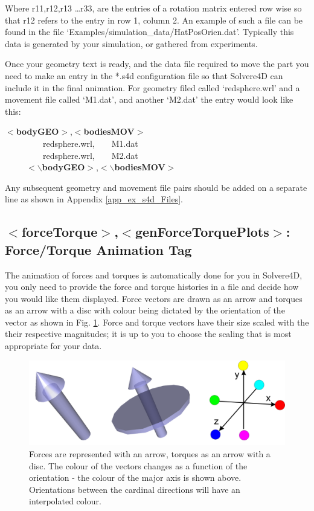 \documentclass[singlecolumn,12pt]{article}
\newcommand{\hlstd}[1]{\textcolor[rgb]{0,0,0}{#1}}
\newcommand{\hlkey}[1]{\textcolor[rgb]{0,0,1}{\bf{#1}}}
\begin{document}
Where r11,r12,r13 \ldots r33, are the entries of a rotation matrix
entered row wise so that r12 refers to the entry in row 1, column 2.
An example of such a file can be found in the file
`Examples/simulation\_data/HatPosOrien.dat'. Typically this data is
generated by your simulation, or gathered from experiments.

Once your geometry text is ready, and the data file required to move
the part you need to make an entry in the *.s4d configuration file
so that Solvere4D can include it in the final animation. For
geometry filed called `redsphere.wrl' and a movement file called
`M1.dat', and another `M2.dat' the entry would look like this:

\vspace{1cm}
\hlkey{$<$bodyGEO$>$}\hlstd{,}\hlkey{$<$bodiesMOV$>$}\hlstd{\\
\hlstd{\ \ \ \ \ \ \ \ \ }redsphere.wrl,\hlstd{\ \ \ \ }M1.dat\\
\hlstd{\ \ \ \ \ \ \ \ \ }redsphere.wrl,\hlstd{\ \ \ \ }M2.dat\\
}\hlstd{\ \ \ \ \
}\hlkey{$<$$\backslash$bodyGEO$>$}\hlstd{,}\hlkey{$<$$\backslash$bodiesMOV$>$}
\vspace{1cm}

Any subsequent geometry and movement file pairs should be added on a
separate line as shown in Appendix \ref{app_ex_s4d_Files}.

\subsection{$<$forceTorque$>$,$<$genForceTorquePlots$>$: Force/Torque Animation Tag}

The animation of forces and torques is automatically done for you in
Solvere4D, you only need to provide the force and torque histories
in a file and decide how you would like them displayed. Force
vectors are drawn as an arrow and torques as an arrow with a disc
with colour being dictated by the orientation of the vector as shown
in Fig. \ref{fig_forcetorque}. Force and torque vectors have their
size scaled with the their respective magnitudes; it is up to you to
choose the scaling that is most appropriate for your data.

\begin{figure}[!h]
\includegraphics[width = \textwidth, height = \textheight, keepaspectratio= true]{fig_forcetorque}
\caption{Forces are represented with an arrow, torques as an arrow
with a disc. The colour of the vectors changes as a function of the
orientation - the colour of the major axis is shown above.
Orientations between the cardinal directions will have an
interpolated colour.\label{fig_forcetorque}}
\end{figure}
\end{document}
